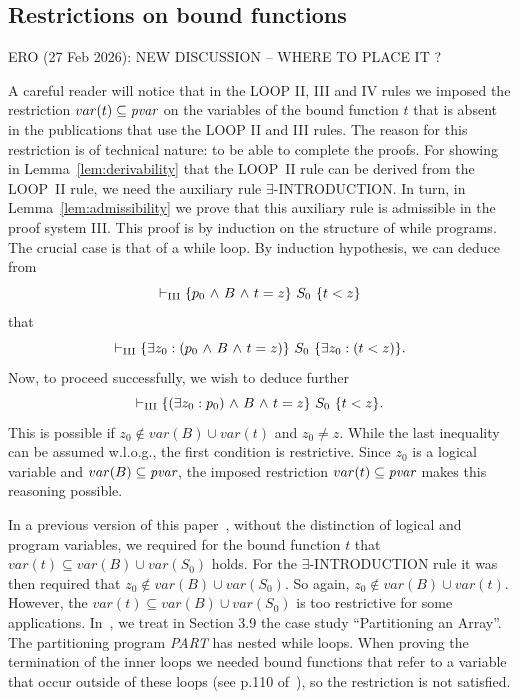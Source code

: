 \documentclass[runningheads]{llncs}       %
\begin{document}


\III


\subsection{Restrictions on bound functions}

ERO (27 Feb 2026): NEW DISCUSSION -- WHERE TO PLACE IT ?
\III


A careful reader will notice that in the LOOP II, III and IV rules we
imposed the restriction $var(t) \subseteq \mbox{\it pvar}$ on the
variables of the bound function $t$ that is absent in the publications
that use the LOOP II and III rules.
The reason for this restriction is of technical nature: to be able 
to complete the proofs.
For showing in Lemma~\ref{lem:derivability} that the LOOP~II rule can
be derived from the LOOP~II rule, we need the auxiliary rule
$\exists$-INTRODUCTION. In turn, in Lemma~\ref{lem:admissibility}
we prove that this auxiliary rule is admissible in the proof system III.
This proof is by induction on the structure of while programs.
The crucial case is that of a while loop. By induction hypothesis,
we can deduce from 
\[
 \vdash_{\rm{III}} \mbox{$\{{p_{0} \mbox{$\ \wedge\ $} B \mbox{$\ \wedge\ $} t = z}\}\ {S_0}\ \{{t < z}\}$}
\]
that
\[
 \vdash_{\rm{III}} \mbox{$\{{\mbox{$\exists$} z_0: (p_{0} \mbox{$\ \wedge\ $} B \mbox{$\ \wedge\ $} t = z)}\}\ {S_0}\ \{{\mbox{$\exists$} z_0: (t < z)}\}$}.
\]
Now, to proceed successfully, we wish to deduce further 
\[
 \vdash_{\rm{III}} \mbox{$\{{(\mbox{$\exists$} z_0:p_0) \mbox{$\ \wedge\ $} B \mbox{$\ \wedge\ $} t = z}\}\ {S_0}\ \{{t < z}\}$}.
\]
This is possible if $z_0 \not\in var(B) \cup var(t)$ and $z_0 \neq z$.
While the last inequality can be assumed w.l.o.g., the first condition
is restrictive.
Since $z_0$ is a logical variable and $var(B) \subseteq \mbox{\it pvar}$,
the imposed restriction $var(t) \subseteq \mbox{\it pvar}$ makes this reasoning
possible.

In a previous version of this paper~\cite{ABO25}, 
without the distinction of logical and program variables,
we required for the bound function $t$ that $var(t) \subseteq var(B) \cup var(S_0)$
holds. For the $\exists$-INTRODUCTION rule it was then required that 
$z_0 \not\in var(B) \cup var(S_0)$.
So again,  $z_0 \not\in var(B) \cup var(t)$.
However, the  $var(t) \subseteq var(B) \cup var(S_0)$ is too restrictive 
for some applications. In~\cite{ABO09}, we treat in Section 3.9 the case study
``Partitioning an Array''. The partitioning program {\it PART} has nested
while loops. When proving the termination of the inner loops we needed
bound functions that refer to a variable that occur outside of these loops
(see p.110 of~\cite{ABO09}), so the restriction is not satisfied.
\end{document}
